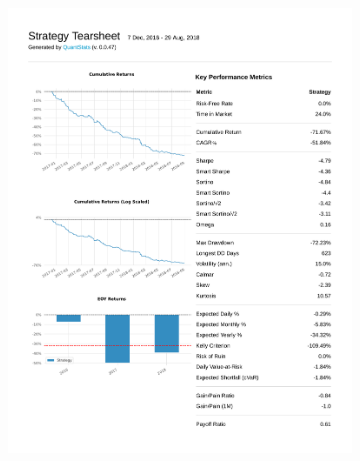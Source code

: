 \documentclass[12pt,a4paper]{article}
\begin{document}
\begin{figure}[ht!]
  \centering
  \begin{subfigure}[ht!]{0.45\textwidth}
    \includegraphics[width=\textwidth]{plots/qs_rand.pdf}
  \end{subfigure}
  \hspace{0.05\textwidth}
  \begin{subfigure}[ht!]{0.45\textwidth}

\end{subfigure}
\end{figure}
\end{document}
